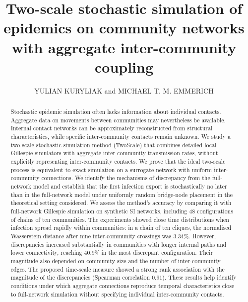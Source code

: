 \documentclass{ieeeaccess}
\let\AccessYear\year
\let\year\TeXyear
\newcommand{\TS}{\textup{TwoScale}}
\begin{document}
\AccessYear{XXXX}
\title{Two-scale stochastic simulation of epidemics on community networks with aggregate inter-community coupling}
\author{\uppercase{Yulian Kuryliak} and \uppercase{Michael T. M. Emmerich}}
\address[1]{Institute of Computer Science and Information Technologies, Lviv Polytechnic National University, 12 Stepan Bandera Street, Lviv 79000, Ukraine (e-mail: yulian.a.kuryliak@lpnu.ua)}
\address[2]{Faculty of Information Technology, University of Jyv\"askyl\"a, P.O. Box 35 (Agora), FI-40014 Jyv\"askyl\"a, Finland (e-mail: michael.t.m.emmerich@jyu.fi)}
\begin{abstract}
Stochastic epidemic simulation often lacks information about individual contacts. Aggregate data on movements between communities may nevertheless be available. Internal contact networks can be approximately reconstructed from structural characteristics, while specific inter-community contacts remain unknown. We study a two-scale stochastic simulation method (\TS{}) that combines detailed local Gillespie simulators with aggregate inter-community transmission rates, without explicitly representing inter-community contacts. We prove that the ideal two-scale process is equivalent to exact simulation on a surrogate network with uniform inter-community connections. We identify the mechanisms of discrepancy from the full-network model and establish that the first infection export is stochastically no later than in the full-network model under uniformly random bridge-node placement in the theoretical setting considered. We assess the method's accuracy by comparing it with full-network Gillespie simulation on synthetic SI networks, including 48 configurations of chains of ten communities. The experiments showed close time distributions when infection spread rapidly within communities: in a chain of ten cliques, the normalised Wasserstein distance after nine inter-community crossings was $3.34\%$. However, discrepancies increased substantially in communities with longer internal paths and lower connectivity, reaching $40.9\%$ in the most discrepant configuration. Their magnitude also depended on community size and the number of inter-community edges. The proposed time-scale measure showed a strong rank association with the magnitude of the discrepancies (Spearman correlation $0.91$). These results help identify conditions under which aggregate connections reproduce temporal characteristics close to full-network simulation without specifying individual inter-community contacts.
\end{abstract}
\end{document}
